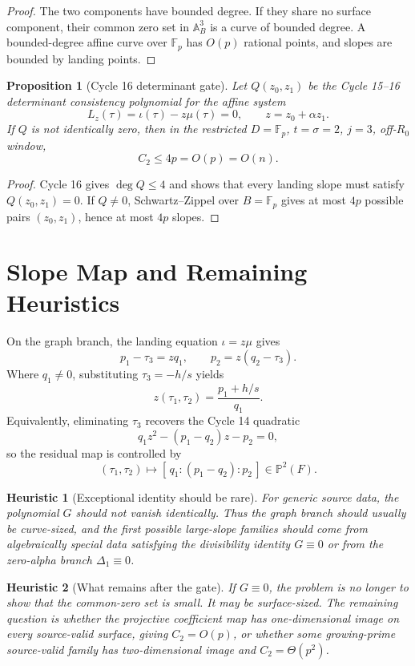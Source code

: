 \documentclass[11pt]{article}
\newtheorem{proposition}{Proposition}
\newtheorem{heuristic}{Heuristic}
\newcommand{\F}{\mathbb F}
\newcommand{\Deltaone}{\Delta_1}
\newcommand{\tauone}{\tau_1}
\newcommand{\tautwo}{\tau_2}
\newcommand{\tauthree}{\tau_3}
\newcommand{\Ctwo}{C_2}
\begin{document}
\begin{proof}
The two components have bounded degree.  If they share no surface component,
their common zero set in \(\mathbb A^3_B\) is a curve of bounded degree.  A
bounded-degree affine curve over \(\F_p\) has \(O(p)\) rational points, and
slopes are bounded by landing points.
\end{proof}

\begin{proposition}[Cycle 16 determinant gate]
\label{prop:det-gate}
Let \(Q(z_0,z_1)\) be the Cycle 15--16 determinant consistency polynomial for
the affine system
\[
  L_z(\tau)=\iota(\tau)-z\mu(\tau)=0,
  \qquad z=z_0+\alpha z_1.
\]
If \(Q\) is not identically zero, then in the restricted \(D=\F_p\),
\(t=\sigma=2\), \(j=3\), off-\(R_0\) window,
\[
  \Ctwo\le 4p=O(p)=O(n).
\]
\end{proposition}

\begin{proof}
Cycle 16 gives \(\deg Q\le4\) and shows that every landing slope must satisfy
\(Q(z_0,z_1)=0\).  If \(Q\ne0\), Schwartz--Zippel over \(B=\F_p\) gives at most
\(4p\) possible pairs \((z_0,z_1)\), hence at most \(4p\) slopes.
\end{proof}

\section{Slope Map and Remaining Heuristics}
\label{sec:slope-map}

On the graph branch, the landing equation \(\iota=z\mu\) gives
\[
  p_1-\tauthree=zq_1,
  \qquad
  p_2=z(q_2-\tauthree).
\]
Where \(q_1\ne0\), substituting \(\tauthree=-h/s\) yields
\[
  z(\tauone,\tautwo)=\frac{p_1+h/s}{q_1}.
\]
Equivalently, eliminating \(\tauthree\) recovers the Cycle 14 quadratic
\[
  q_1z^2-(p_1-q_2)z-p_2=0,
\]
so the residual map is controlled by
\[
  (\tauone,\tautwo)
  \longmapsto [\,q_1:(p_1-q_2):p_2\,]\in\mathbb P^2(F).
\]

\begin{heuristic}[Exceptional identity should be rare]
For generic source data, the polynomial \(G\) should not vanish identically.
Thus the graph branch should usually be curve-sized, and the first possible
large-slope families should come from algebraically special data satisfying
the divisibility identity \(G\equiv0\) or from the zero-alpha branch
\(\Deltaone\equiv0\).
\end{heuristic}

\begin{heuristic}[What remains after the gate]
If \(G\equiv0\), the problem is no longer to show that the common-zero set is
small.  It may be surface-sized.  The remaining question is whether the
projective coefficient map has one-dimensional image on every source-valid
surface, giving \(\Ctwo=O(p)\), or whether some growing-prime source-valid
family has two-dimensional image and \(\Ctwo=\Theta(p^2)\).
\end{heuristic}
\end{document}
